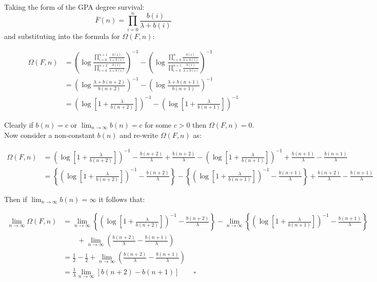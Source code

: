 \documentclass[
  sn-basic,
]{sn-jnl}
\theoremstyle{plain}
\theoremstyle{remark}
\begin{document}
Taking the form of the GPA degree survival: \[
\bar F(n) = \prod_{i=0}^n\frac{b(i)}{\lambda+b(i)}
\] and substituting into the formula for \(\Omega(F,n)\):

\begin{align*}
\Omega(F,n)&=\left(\log\frac{\prod_{i=0}^{n+1}\frac{b(i)}{\lambda+b(i)}}{\prod_{i=0}^{n+2}\frac{b(i)}{\lambda+b(i)}}\right)^{-1}-\left(\log\frac{\prod_{i=0}^{n}\frac{b(i)}{\lambda+b(i)}}{\prod_{i=0}^{n+1}\frac{b(i)}{\lambda+b(i)}}\right)^{-1}\\
&=\left(\log\frac{\lambda+b(n+2)}{b(n+2)}\right)^{-1}-\left(\log\frac{\lambda+b(n+1)}{b(n+1)}\right)^{-1}\\
&=\left(\log\left[1+\frac{\lambda}{b(n+2)}\right]\right)^{-1}-\left(\log\left[1+\frac{\lambda}{b(n+1)}\right]\right)^{-1}
\end{align*}

Clearly if \(b(n)=c\) or \(\lim_{n\rightarrow\infty}b(n)=c\) for some
\(c>0\) then \(\Omega(F,n)=0\). Now consider a non-constant \(b(n)\) and
re-write \(\Omega(F,n)\) as:

\begin{align*}
\Omega(F,n) &= \left(\log\left[1+\frac{\lambda}{b(n+2)}\right]\right)^{-1}-\frac{b(n+2)}{\lambda}+\frac{b(n+2)}{\lambda}-\left(\log\left[1+\frac{\lambda}{b(n+1)}\right]\right)^{-1}+\frac{b(n+1)}{\lambda}  -\frac{b(n+1)}{\lambda}\\
&=\left\{ \left(\log\left[1+\frac{\lambda}{b(n+2)}\right]\right)^{-1}-\frac{b(n+2)}{\lambda}\right\} - \left\{ \left(\log\left[1+\frac{\lambda}{b(n+1)}\right]\right)^{-1}-\frac{b(n+1)}{\lambda}\right\}+\frac{b(n+2)}{\lambda}-\frac{b(n+1)}{\lambda}
\end{align*}

Then if \(\lim_{n\rightarrow\infty}b(n)=\infty\) it follows that:

\begin{align*}
\lim_{n\rightarrow\infty}\Omega(F,n) &= \lim_{n\rightarrow\infty}\left\{ \left(\log\left[1+\frac{\lambda}{b(n+2)}\right]\right)^{-1}-\frac{b(n+2)}{\lambda}\right\} - \lim_{n\rightarrow\infty}\left\{ \left(\log\left[1+\frac{\lambda}{b(n+1)}\right]\right)^{-1}-\frac{b(n+1)}{\lambda}\right\}\\
&\qquad+\lim_{n\rightarrow\infty}\left(\frac{b(n+2)}{\lambda}-\frac{b(n+1)}{\lambda}\right)\\
&=\frac{1}{2}-\frac{1}{2} + \lim_{n\rightarrow\infty}\left(\frac{b(n+2)}{\lambda}-\frac{b(n+1)}{\lambda}\right)\\
&=\frac{1}{\lambda}\lim_{n\rightarrow\infty}\left[b(n+2)-b(n+1)\right]\qquad \square
\end{align*}
\end{document}

